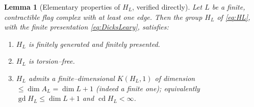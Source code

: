 \documentclass{amsart}
\newtheorem{lemma}{Lemma}
\theoremstyle{definition}
\newcommand{\gd}{\operatorname{gd}}
\newcommand{\cd}{\operatorname{cd}}
\newcommand{\AL}{A_{L}}
\newcommand{\HL}{H_{L}}
\begin{document}
\begin{lemma}[Elementary properties of $\HL$, verified directly]\label{lem:explicitverify}
Let $L$ be a finite, contractible flag complex with at least one edge. Then the group
$\HL$ of \eqref{eq:HL}, with the finite presentation \eqref{eq:DicksLeary}, satisfies:
\begin{enumerate}
\item[\textup{(a)}] $\HL$ is finitely generated and finitely presented.
\item[\textup{(b)}] $\HL$ is torsion--free.
\item[\textup{(c)}] $\HL$ admits a finite--dimensional $K(\HL,1)$ of dimension
$\le\dim\AL=\dim L+1$ (indeed a finite one); equivalently
$\gd\HL\le\dim L+1$ and $\cd\HL<\infty$.
\end{enumerate}
\end{lemma}
\end{document}
